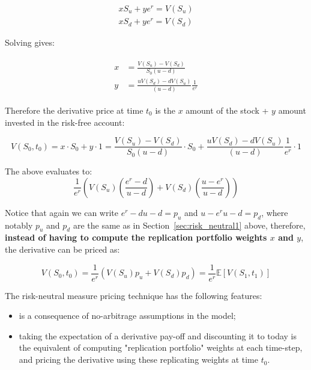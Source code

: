 \begin{equation}
\begin{split}
𝑥𝑆_𝑢+𝑦𝑒^{𝑟}=𝑉(𝑆_𝑢)\\
𝑥𝑆_𝑑+𝑦𝑒^{𝑟}=𝑉(𝑆_𝑑)
\end{split}
\end{equation}

Solving gives:

\begin{align}
\begin{split}
𝑥&=\frac{𝑉(𝑆_𝑢)−𝑉(𝑆_𝑑)}{𝑆_0(𝑢−𝑑)}\\
𝑦&=\frac{𝑢𝑉(𝑆_𝑑)−𝑑𝑉(𝑆_𝑢)}{(𝑢−𝑑)}\frac{1}{𝑒^{𝑟}}
\end{split}
\end{align}

Therefore the derivative price at time $𝑡_0$ is the $𝑥$ amount of the stock + $𝑦$ amount invested in the risk-free account:

\begin{equation}
𝑉(𝑆_0,𝑡_0) =𝑥\cdot 𝑆_0+𝑦\cdot 1 =\frac{𝑉(𝑆_𝑢)−𝑉(𝑆_𝑑)}{𝑆_0(𝑢−𝑑)}\cdot 𝑆_0 + \frac{𝑢𝑉(𝑆_𝑑)−𝑑𝑉(𝑆_𝑢)}{(𝑢−𝑑)}\frac{1}{e^{r}}\cdot 1
\end{equation}

The above evaluates to:
\begin{equation}
\frac{1}{e^{r}}\left(𝑉(𝑆_𝑢)\left(\frac{e^{r}−𝑑}{𝑢−𝑑}\right)+𝑉(𝑆_𝑑)\left(\frac{𝑢−e^{r}}{𝑢−𝑑}\right)\right)
\end{equation}

Notice that again we can write $𝑒^{𝑟}−𝑑𝑢−𝑑 = 𝑝_𝑢$ and $𝑢−𝑒^{𝑟}𝑢−𝑑 = 𝑝_𝑑$, where notably $𝑝_𝑢$ and $𝑝_𝑑$ are the same as in Section~\ref{sec:risk_neutral1} above, therefore, \textbf{instead of having to compute the replication portfolio weights $𝑥$ and $𝑦$}, the derivative can be priced as:

\begin{equation}
𝑉(𝑆_0,𝑡_0)=\frac{1}{e^{r}}(𝑉(𝑆_𝑢)𝑝_𝑢+𝑉(𝑆_𝑑)𝑝_𝑑)=\frac{1}{e^{r}}\mathbb{E}[𝑉(𝑆_1,𝑡_1)]
\end{equation}

The risk-neutral measure pricing technique has the following features:
\begin{itemize}
\item is a consequence of no-arbitrage assumptions in the model;
\item taking the expectation of a derivative pay-off and discounting it to today is the equivalent of computing "replication portfolio" weights at each time-step, and pricing the derivative using these replicating weights at time $𝑡_0$.
\end{itemize}

